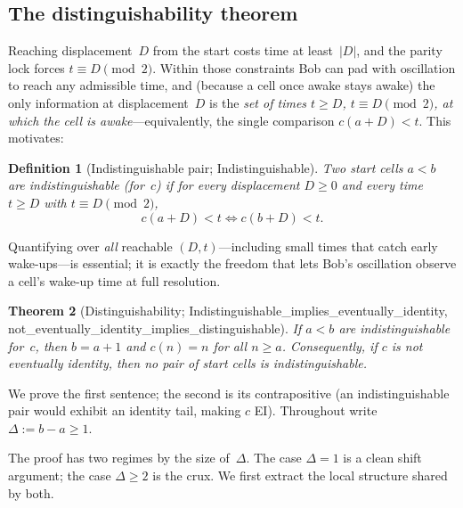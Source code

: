 \documentclass{article}
\newtheorem{theorem}{Theorem}[section]
\newtheorem{definition}[theorem]{Definition}
\newcommand{\us}{\discretionary{}{}{}\_\discretionary{}{}{}}
\newcommand{\lean}[1]{{\small\ttfamily #1}}
\begin{document}
\subsection{The distinguishability theorem}\label{sec:distinguish}

Reaching displacement~$D$ from the start costs time at least~$|D|$, and
the parity lock forces $t\equiv D\pmod 2$. Within those constraints Bob
can pad with oscillation to reach any admissible time, and (because a cell
once awake stays awake) the only information at displacement~$D$ is the
\emph{set of times $t\ge D$, $t\equiv D\pmod 2$, at which the cell is
awake}---equivalently, the single comparison $c(a+D) < t$. This motivates:

\begin{definition}[Indistinguishable pair; \lean{Indistinguishable}]\label{def:indist}
Two start cells $a<b$ are \emph{indistinguishable} (for~$c$) if for every
displacement $D\ge 0$ and every time $t\ge D$ with $t\equiv D\pmod 2$,
\[
  c(a+D) < t \iff c(b+D) < t .
\]
\end{definition}

Quantifying over \emph{all} reachable $(D,t)$---including small times that
catch early wake-ups---is essential; it is exactly the freedom that lets
Bob's oscillation observe a cell's wake-up time at full resolution.

\begin{theorem}[Distinguishability;
  \lean{Indistinguishable\us implies\us eventually\us identity},
  \lean{not\us eventually\us identity\us implies\us distinguishable}]
\label{thm:lemmaA}
If $a<b$ are indistinguishable for~$c$, then $b=a+1$ and $c(n)=n$ for all
$n\ge a$. Consequently, if $c$ is not eventually identity, then \emph{no}
pair of start cells is indistinguishable.
\end{theorem}

We prove the first sentence; the second is its contrapositive (an
indistinguishable pair would exhibit an identity tail, making $c$ EI).
Throughout write $\Delta := b-a \ge 1$.

The proof has two regimes by the size of~$\Delta$. The case $\Delta=1$ is
a clean shift argument; the case $\Delta\ge 2$ is the crux. We first
extract the local structure shared by both.
\end{document}
